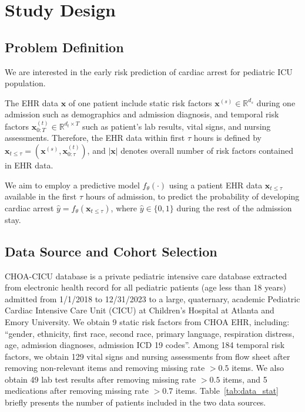 \section{Study Design}
\label{sec:study}
\subsection{Problem Definition}
We are interested in the early risk prediction of cardiac arrest for pediatric ICU population.  
\begin{definition}
The EHR data $\mathbf{x}$ of one patient include static risk factors $\mathbf{x}^{(s)} \in \mathbb{R}^{d_s}$ during one admission such as demographics and admission diagnosis, and temporal risk factors $\mathbf{x}^{(t)}_{0:T} \in \mathbb{R}^{d_t\times T}$ such as patient's lab results, vital signs, and nursing assessments. Therefore, the EHR data within first $\tau$ hours is defined by $\mathbf{x}_{{t\leq \tau}}=(\mathbf{x}^{(s)}, \mathbf{x}^{(t)}_{0:\tau})$, and $|\mathbf{x}|$ denotes overall number of risk factors contained in EHR data. 
\end{definition}

\begin{definition}
We aim to employ a predictive model $f_\theta(\cdot)$ using a patient EHR data $\mathbf{x}_{t\leq \tau}$ available in the first $\tau$ hours of admission, to predict the probability of developing cardiac arrest $\hat{y}=f_\theta(\mathbf{x}_{t\leq \tau})$, where $\hat{y} \in \{0, 1\}$ during the rest of the admission stay.
\end{definition}


\subsection{Data Source and Cohort Selection}
CHOA-CICU database is a private pediatric intensive care database extracted from electronic health record for all pediatric patients (age less than 18 years) admitted from 1/1/2018 to 12/31/2023 to a large, quaternary, academic Pediatric Cardiac Intensive Care Unit (CICU) at Children's Hospital at Atlanta and Emory University. 
We obtain 9 static risk factors from CHOA EHR, including: ``gender, ethnicity, first race, second race, primary language, respiration distress, age, admission diagnoses, admission ICD 19 codes''. Among 184 temporal risk factors, we obtain 129 vital signs and nursing assessments from flow sheet after removing non-relevant items and removing missing rate $> 0.5$ items. We also obtain 49 lab test results after removing missing rate $> 0.5$ items, and 5 medications after removing missing rate $> 0.7$ items.
Table~\ref{tab:data_stat} briefly presents the number of patients included in the two data sources. 

